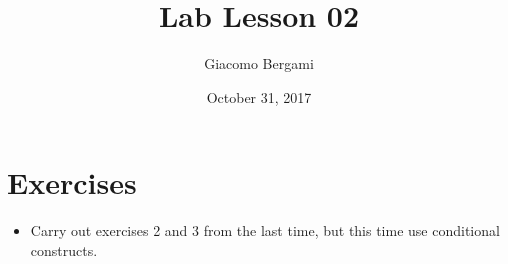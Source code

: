 \documentclass[]{scrartcl}
\title{Lab Lesson 02}
\date{October 31, 2017}
\author{Giacomo Bergami}
\begin{document}
\maketitle
\section*{Exercises}

\begin{itemize}
\item Carry out exercises 2 and 3 from the last time, but this time use  conditional constructs.
\end{itemize}
\end{document}
